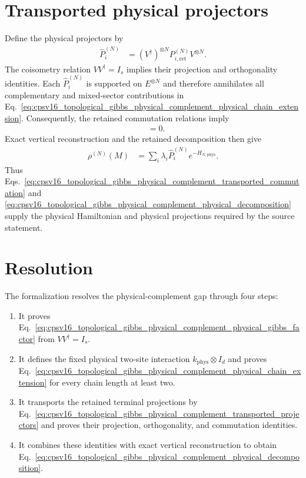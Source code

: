 \documentclass{article}
\begin{document}
\section{Transported physical projectors}

Define the physical projectors by
\begin{align}
    \widehat P_i^{(N)}
        &= (V^\dagger)^{\otimes N}
           P_{i,\mathrm{ret}}^{(N)}
           V^{\otimes N}.
    \label{eq:cpsv16_topological_gibbs_physical_complement_transported_projectors}
\end{align}
The coisometry relation
$VV^\dagger=I_s$ implies their projection and orthogonality identities. Each
$\widehat P_i^{(N)}$ is supported on $E^{\otimes N}$ and therefore annihilates
all complementary and mixed-sector contributions in
Eq.~\ref{eq:cpsv16_topological_gibbs_physical_complement_physical_chain_extension}.
Consequently, the retained commutation relations imply
\begin{align}
    [\widehat P_i^{(N)},e^{-H_{N,\mathrm{phys}}}]
        &= 0.
    \label{eq:cpsv16_topological_gibbs_physical_complement_transported_commutation}
\end{align}
Exact vertical reconstruction and the retained decomposition then give
\begin{align}
    \rho^{(N)}(M)
        &= \sum_i\lambda_i\widehat P_i^{(N)}
           e^{-H_{N,\mathrm{phys}}}.
    \label{eq:cpsv16_topological_gibbs_physical_complement_physical_decomposition}
\end{align}
Thus
Eqs.~\ref{eq:cpsv16_topological_gibbs_physical_complement_transported_commutation}
and
\ref{eq:cpsv16_topological_gibbs_physical_complement_physical_decomposition}
supply the physical Hamiltonian and physical projections required by the
source statement.

\section{Resolution}

The formalization resolves the physical-complement gap through four steps:
\begin{enumerate}
    \item It proves
    Eq.~\ref{eq:cpsv16_topological_gibbs_physical_complement_physical_gibbs_factor}
    from $VV^\dagger=I_s$.
    \item It defines the fixed physical two-site interaction
    $k_{\mathrm{phys}}\otimes I_d$ and proves
    Eq.~\ref{eq:cpsv16_topological_gibbs_physical_complement_physical_chain_extension}
    for every chain length at least two.
    \item It transports the retained terminal projections by
    Eq.~\ref{eq:cpsv16_topological_gibbs_physical_complement_transported_projectors}
    and proves their projection, orthogonality, and commutation identities.
    \item It combines these identities with exact vertical reconstruction to
    obtain
    Eq.~\ref{eq:cpsv16_topological_gibbs_physical_complement_physical_decomposition}.
\end{enumerate}
\end{document}
